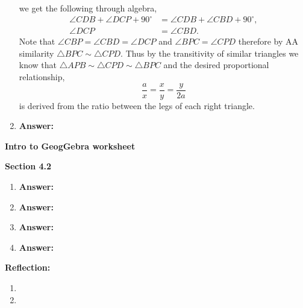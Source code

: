 \documentclass[12pt]{article}
\theoremstyle{homework}
\begin{document}
\begin{enumerate}
we get the following through algebra, 
\begin{align*}
  \angle CDB + \angle DCP + 90^{\circ} &= \angle CDB + \angle CBD + 90^{\circ},\\
  \angle DCP &= \angle CBD.
\end{align*}
Note that $\angle CBP = \angle CBD = \angle DCP$ and $\angle BPC =\angle CPD$ therefore by AA similarity $\triangle BPC \sim \triangle CPD$. Thus by 
the transitivity of similar triangles we know that $\triangle APB \sim \triangle CPD \sim \triangle BPC$ and the desired proportional relationship,
\begin{equation*}
  \frac{a}{x} = \frac{x}{y} = \frac{y}{2a}
\end{equation*}
is derived from the ratio between the legs of each right triangle. 






\vspace{.5in}



\setcounter{enumi}{3}
\item
\textbf{Answer:} 
\vspace{.5in}



\end{enumerate}
\vspace{.5in}

\textbf{Intro to GeogGebra worksheet}



\textbf{Section 4.2}
\begin{enumerate}
\item 
\textbf{Answer:}
\vspace{.5in}

\setcounter{enumi}{6}
\item
\textbf{Answer:} 
\vspace{.5in}


\setcounter{enumi}{10}
\item
\textbf{Answer:} 
\vspace{.5in}





\setcounter{enumi}{11}
\item
\textbf{Answer:} 
\vspace{.5in}

\end{enumerate}
\vspace{.5in}



\textbf{Reflection:}
\begin{enumerate}
\item 
\item 
\end{enumerate}
\end{document}
